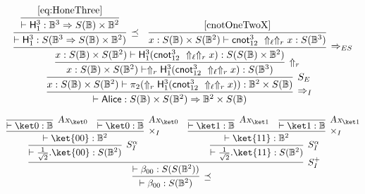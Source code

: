 \documentclass[preprint]{elsarticle}
\newcommand\B{\ensuremath{\mathbb B}}
\newcommand\s[1]{\ensuremath{\mathsf{#1}}}
\newcommand\tax{\textsl{Ax}}
\begin{document}
\begin{equation}
  \label{eq:Alice}
  \infer[\Rightarrow_I]
  {\vdash\s{Alice}:S(\B)\times S(\B^2)\Rightarrow\B^2\times S(\B)}
  {
    \infer[S_E]
    {x:S(\B)\times S(\B^2)\vdash\pi_2(\Uparrow_r \s H_1^3(\s{cnot}_{12}^3\ \Uparrow_\ell \Uparrow_r x)):\B^2\times S(\B)}
    {
      \infer[\Uparrow_r]
      {x:S(\B)\times S(\B^2)\vdash \Uparrow_r \s H_1^3(\s{cnot}_{12}^3\ \Uparrow_\ell \Uparrow_r x):S(\B^3)}
      {
        \infer[\Rightarrow_{ES}]
        {x:S(\B)\times S(\B^2)\vdash \s H_1^3(\s{cnot}_{12}^3\ \Uparrow_\ell \Uparrow_r x):S(S(\B)\times\B^2)}
        {
          \infer[\preceq]
          {\vdash \s H_1^3:S(\B^3\Rightarrow S(\B)\times\B^2)}
          {
            \infer
            {\vdash \s H_1^3:\B^3\Rightarrow S(\B)\times\B^2}
            {\eqref{eq:HoneThree}}
          }
          &
          \infer[]
          {x:S(\B)\times S(\B^2)\vdash \s{cnot}_{12}^3\ \Uparrow_\ell \Uparrow_r x:S(\B^3)}
          {\eqref{cnotOneTwoX}}
        }
      }
    }
  }
\end{equation}

\begin{equation}
  \label{eq:Bell}
  \infer[\preceq]
  {\vdash\beta_{00}:S(\B^2)}
  {
    \infer[S_I^+]
    {\vdash\beta_{00}:S(S(\B^2))}
    {
      \infer[S_I^\alpha]
      {\vdash\frac 1{\sqrt 2}.\ket{00}:S(\B^2)}
      {
        \infer[\times_I]
        {\vdash\ket{00}:\B^2}
        {
          \infer[\tax_{\ket 0}]{\vdash\ket 0:\B}{}
          &
          \infer[\tax_{\ket 0}]{\vdash\ket 0:\B}{}
        }
      }
      &
      \infer[S_I^\alpha]
      {\vdash\frac 1{\sqrt 2}.\ket{11}:S(\B^2)}
      {
        \infer[\times_I]
        {\vdash\ket{11}:\B^2}
        {
          \infer[\tax_{\ket 1}]{\vdash\ket 1:\B}{}
          &
          \infer[\tax_{\ket 1}]{\vdash\ket 1:\B}{}
        }
      }
    }
  }
\end{equation}
\end{document}

